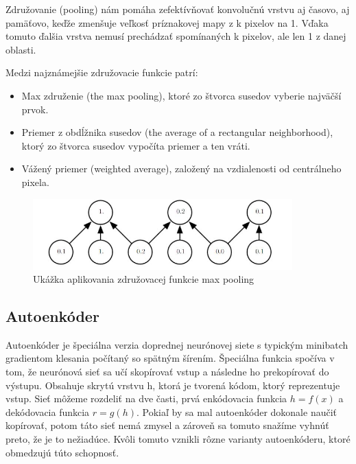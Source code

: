 	
\hspace{10mm}Združovanie (pooling) nám pomáha zefektívňovať konvolučnú vrstvu aj časovo, aj pamäťovo, keďže zmenšuje veľkosť príznakovej mapy z k pixelov na 1. Vďaka tomuto ďalšia vrstva nemusí prechádzať spomínaných k pixelov, ale len 1 z danej oblasti.
\cite{Goodfellow-et-al-2016}

Medzi najznámejšie združovacie funkcie patrí:
\begin{itemize}
    \item Max združenie (the max pooling), ktoré zo štvorca susedov vyberie najväčší prvok.
    \item Priemer z obdĺžnika susedov (the average of a rectangular neighborhood), ktorý zo štvorca susedov vypočíta priemer a ten vráti.
    \item Vážený priemer (weighted average), založený na vzdialenosti od centrálneho pixela. 
\end{itemize}

\begin{figure}[h!]
\begin{centering}
\includegraphics[width=10cm]{assets/images/233_2_1.JPG}
\par\end{centering}
\caption{Ukážka aplikovania združovacej funkcie max pooling \label{fig:dynabook}\cite{Goodfellow-et-al-2016}}
\end{figure}

\subsection{Autoenkóder} \label{autoenkoder}

\hspace{10mm}Autoenkóder je špeciálna verzia doprednej neurónovej siete s typickým  minibatch gradientom klesania počítaný so spätným šírením. Špeciálna funkcia spočíva v tom, že neurónová sieť sa učí skopírovať vstup a následne ho prekopírovať do výstupu. Obsahuje skrytú vrstvu h, ktorá je tvorená kódom, ktorý reprezentuje vstup. Sieť môžeme rozdeliť na dve časti, prvá enkódovacia funkcia \(h = f(x)\) a dekódovacia funkcia \(r = g(h)\). Pokiaľ by sa mal autoenkóder dokonale naučiť kopírovať, potom táto sieť nemá zmysel a zároveň sa tomuto snažíme vyhnúť preto, že je to nežiadúce. Kvôli tomuto vznikli rôzne varianty autoenkóderu, ktoré obmedzujú túto schopnosť. 

